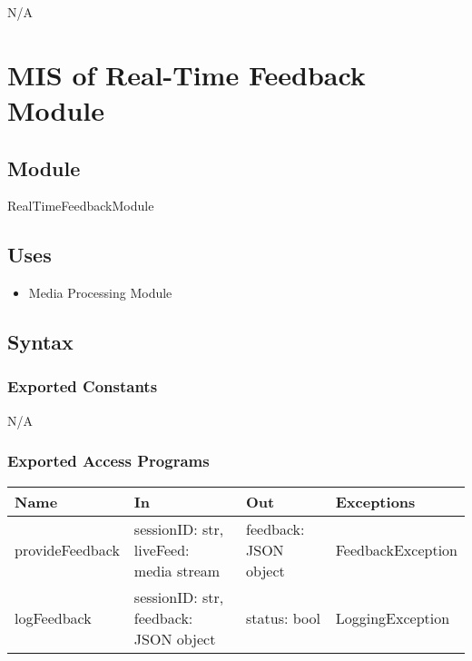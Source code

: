 \documentclass[12pt, titlepage]{article}
\begin{document}
N/A
\section{MIS of Real-Time Feedback Module} \label{RealTimeFeedbackModule}

\subsection{Module}

RealTimeFeedbackModule

\subsection{Uses}

\begin{itemize}
\item Media Processing Module
\end{itemize}

\subsection{Syntax}

\subsubsection{Exported Constants}

N/A

\subsubsection{Exported Access Programs}

\begin{center}
\begin{tabular}{p{3cm} p{4cm} p{4cm} p{5cm}}
\hline
\textbf{Name} & \textbf{In} & \textbf{Out} & \textbf{Exceptions} \\
\hline
provideFeedback & \raggedright\arraybackslash sessionID: str, liveFeed: media stream & \raggedright\arraybackslash feedback: JSON object & \raggedright\arraybackslash FeedbackException \\

logFeedback & \raggedright\arraybackslash sessionID: str, feedback: JSON object & \raggedright\arraybackslash status: bool & \raggedright\arraybackslash LoggingException \\
\hline
\end{tabular}
\end{center}
\end{document}
